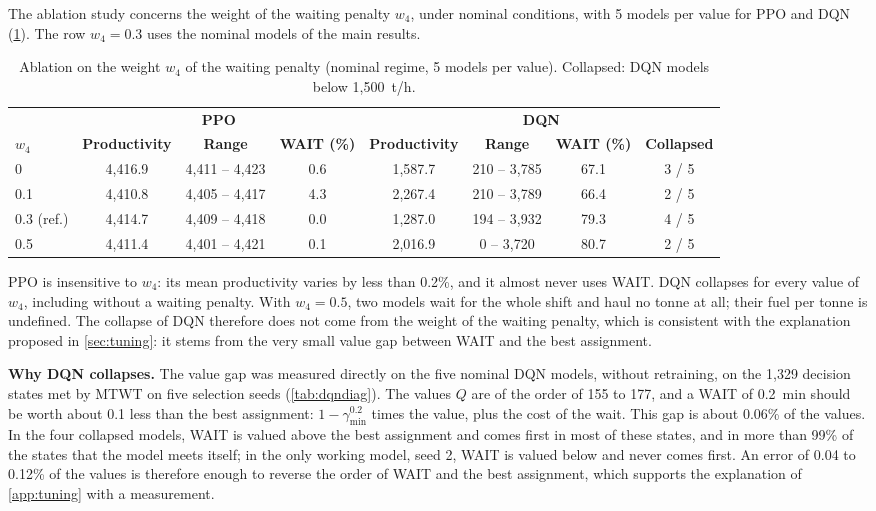 \documentclass[11pt,a4paper]{article}
\newif\ifrevmarks
\newcommand{\revtag}[1]{\ifrevmarks\textsuperscript{\textcolor{red!70!black}{\scriptsize[#1]}}\fi}
\newenvironment{revbloc}[1]{\par\ifrevmarks\color{revcolor}\noindent\revtag{#1}\ \fi}{\par}
\newif\ifcorrmarks
\newcommand{\corr}[1]{\ifcorrmarks\textcolor{corrcolor}{#1}\else#1\fi}
\newenvironment{corrbloc}{\par\ifcorrmarks\color{corrcolor}\fi}{\par}
\begin{document}
\begin{revbloc}{T31}
The ablation study concerns the weight of the waiting penalty $w_4$, under nominal conditions, with 5 models per value for PPO and DQN (\cref{tab:ablation}). The row $w_4 = 0.3$ uses the nominal models of the main results.

\begin{table}[H]
\centering
\caption{Ablation on the weight $w_4$ of the waiting penalty (nominal regime, 5 models per value). Collapsed: DQN models below 1{,}500~t/h.}
\label{tab:ablation}
\footnotesize
\setlength{\tabcolsep}{3pt}
\begin{tabular}{@{}l|ccc|cccc@{}}
\toprule
 & \multicolumn{3}{c|}{\textbf{PPO}} & \multicolumn{4}{c}{\textbf{DQN}} \\
\textbf{$w_4$} & \textbf{Productivity} & \textbf{Range} & \textbf{WAIT (\%)} & \textbf{Productivity} & \textbf{Range} & \textbf{WAIT (\%)} & \textbf{Collapsed} \\
\midrule
0          & 4,416.9 & 4,411 -- 4,423 & 0.6 & 1,587.7 & 210 -- 3,785 & 67.1 & 3 / 5 \\
0.1        & 4,410.8 & 4,405 -- 4,417 & 4.3 & 2,267.4 & 210 -- 3,789 & 66.4 & 2 / 5 \\
0.3 (ref.) & 4,414.7 & 4,409 -- 4,418 & 0.0 & 1,287.0 & 194 -- 3,932 & 79.3 & 4 / 5 \\
0.5        & 4,411.4 & 4,401 -- 4,421 & 0.1 & 2,016.9 & 0 -- 3,720 & 80.7 & 2 / 5 \\
\bottomrule
\end{tabular}
\end{table}

PPO is insensitive to $w_4$: its \corr{mean productivity varies by less than 0.2\%}, and it almost never uses WAIT. DQN collapses for every value of $w_4$, including without a waiting penalty. With $w_4 = 0.5$, two models wait for the whole shift and haul no tonne at all; their fuel per tonne is undefined. The collapse of DQN therefore does not come from the weight of the waiting penalty, which is consistent with the explanation proposed in \cref{sec:tuning}: it stems from the very small value gap between WAIT and the best assignment.

\begin{corrbloc}
\textbf{Why DQN collapses.} The value gap was measured directly on the five nominal DQN models, without retraining, on the 1{,}329 decision states met by MTWT on five selection seeds (\cref{tab:dqndiag}). The values $Q$ are of the order of 155 to 177, and a WAIT of 0.2~min should be worth about 0.1 less than the best assignment: $1-\gamma_{\min}^{0.2}$ times the value, plus the cost of the wait. This gap is about 0.06\% of the values. In the four collapsed models, WAIT is valued above the best assignment and comes first in most of these states, and in more than 99\% of the states that the model meets itself; in the only working model, seed 2, WAIT is valued below and never comes first. An error of 0.04 to 0.12\% of the values is therefore enough to reverse the order of WAIT and the best assignment, which supports the explanation of \corr{\cref{app:tuning}} with a measurement.


\end{corrbloc}
\end{revbloc}
\end{document}

